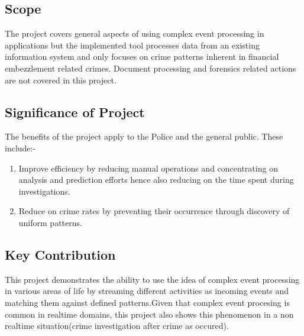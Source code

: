 \subsection{Scope}
The project covers general aspects of using complex event processing in applications but the implemented tool processes data from an existing information system and only focuses on crime patterns inherent in financial embezzlement related crimes. Document processing and forensics related actions are not covered in this project.

\subsection{Significance of Project}

\noindent The benefits of the project apply to the Police and the general public. These include:-
\begin{enumerate}
\item Improve efficiency by reducing manual operations and concentrating on analysis and prediction efforts hence also reducing on the time spent during investigations.  
\item Reduce on crime rates by preventing their occurrence through discovery of uniform patterns.

\end{enumerate}

\subsection{Key Contribution}

\noindent This project demonstrates the ability to use the idea of complex event processing in various areas of life by streaming different activities as incoming events and matching them against defined patterns.Given that complex event procesing is common in realtime domains, this project also shows this phenomenon in a non realtime situation(crime investigation after crime as occured).
